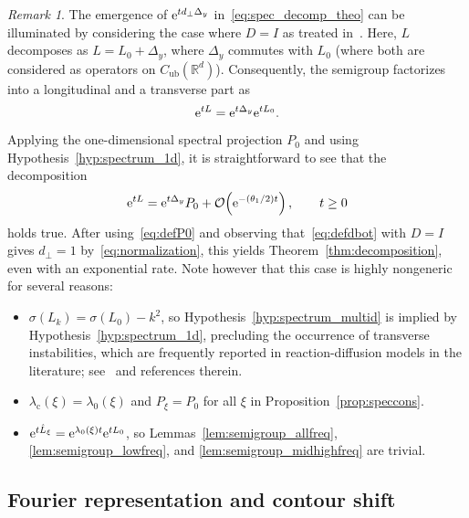 \documentclass[12pt,oneside,a4paper,reqno]{amsart}
\numberwithin{equation}{section}
\theoremstyle{definition}
\theoremstyle{remark}
\newtheorem{remark}[theorem]{Remark}
\newcommand{\bbR}{{\mathbb R}}
\newcommand{\Cub}{{C_{\mathrm{ub}}}}
\newcommand{\re}{{\rm e}}
\begin{document}
\begin{remark}
    \label{rem:Didentity}
    The emergence of $\re^{t d_{\bot}\Delta_y}$ in~\eqref{eq:spec_decomp_theo} can be illuminated by considering the case where $D = I$ as treated in~\cite{kapitula_multidimensional_1997}.
    Here, $L$ decomposes as $L = L_0 + \Delta_y$, where $\Delta_y$ commutes with $L_0$ (where both are considered as operators on $\Cub(\bbR^d)$).
    Consequently, the semigroup factorizes into a longitudinal and a transverse part as
    \begin{equation*}
        \re^{tL} = \re^{t\Delta_y}\re^{tL_0}.
    \end{equation*}
    Applying the one-dimensional spectral projection $P_0$ and using Hypothesis~\ref{hyp:spectrum_1d}, it is straightforward to see that the decomposition
\begin{align} \label{eq:decompKap}
\re^{tL} = \re^{t\Delta_y} P_0 + \mathcal{O}\!\left(\re^{-(\theta_1 / 2) t}\right), \qquad t \geq 0
\end{align}
holds true.
After using~\eqref{eq:defP0} and observing that~\eqref{eq:defdbot} with $D = I$ gives $d_{\bot} = 1$ by~\eqref{eq:normalization}, this yields Theorem~\ref{thm:decomposition}, even with an exponential rate.
Note however that this case is highly nongeneric for several reasons:
\begin{itemize}
    \item $\sigma(L_k) = \sigma(L_0) - k^2$, so Hypothesis~\ref{hyp:spectrum_multid} is implied by Hypothesis~\ref{hyp:spectrum_1d}, precluding the occurrence of transverse instabilities, which are frequently reported in reaction-diffusion models in the literature; see~\cite{carter_criteria_2023,terman_stability_1990,taniguchi_instability_2003} and references therein. 
    \item $\lambda_{\mathrm{c}}(\xi) = \lambda_0(\xi)$ and $P_{\xi} = P_0$ for all $\xi$ in Proposition~\ref{prop:speccons}.
    \item $\re^{t\hat{L}_{\xi}} = \re^{\lambda_0(\xi)t} \re^{tL_0}$, so Lemmas~\ref{lem:semigroup_allfreq}, \ref{lem:semigroup_lowfreq}, and \ref{lem:semigroup_midhighfreq} are trivial.
\end{itemize}
\end{remark}

\subsection{Fourier representation and contour shift} \label{subsec:Fourier_rep}
\end{document}
